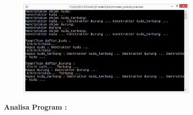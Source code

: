 \begin{figure}[htbp]
\centering
\includegraphics[width=0.8\textwidth]{../manuscript/images/capture9-1}

\end{figure}

\textbf{Analisa Program :}


